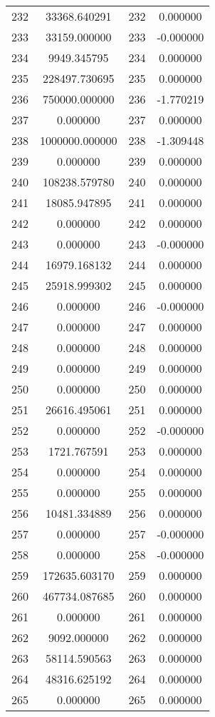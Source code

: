 \documentclass[12pt]{article}
\begin{document}
\begin{longtable}{@{}cccc@{}}
232 & 33368.640291 & 232 & 0.000000 \\
233 & 33159.000000 & 233 & -0.000000 \\
234 & 9949.345795 & 234 & 0.000000 \\
235 & 228497.730695 & 235 & 0.000000 \\
236 & 750000.000000 & 236 & -1.770219 \\
237 & 0.000000 & 237 & 0.000000 \\
238 & 1000000.000000 & 238 & -1.309448 \\
239 & 0.000000 & 239 & 0.000000 \\
240 & 108238.579780 & 240 & 0.000000 \\
241 & 18085.947895 & 241 & 0.000000 \\
242 & 0.000000 & 242 & 0.000000 \\
243 & 0.000000 & 243 & -0.000000 \\
244 & 16979.168132 & 244 & 0.000000 \\
245 & 25918.999302 & 245 & 0.000000 \\
246 & 0.000000 & 246 & -0.000000 \\
247 & 0.000000 & 247 & 0.000000 \\
248 & 0.000000 & 248 & 0.000000 \\
249 & 0.000000 & 249 & 0.000000 \\
250 & 0.000000 & 250 & 0.000000 \\
251 & 26616.495061 & 251 & 0.000000 \\
252 & 0.000000 & 252 & -0.000000 \\
253 & 1721.767591 & 253 & 0.000000 \\
254 & 0.000000 & 254 & 0.000000 \\
255 & 0.000000 & 255 & 0.000000 \\
256 & 10481.334889 & 256 & 0.000000 \\
257 & 0.000000 & 257 & -0.000000 \\
258 & 0.000000 & 258 & -0.000000 \\
259 & 172635.603170 & 259 & 0.000000 \\
260 & 467734.087685 & 260 & 0.000000 \\
261 & 0.000000 & 261 & 0.000000 \\
262 & 9092.000000 & 262 & 0.000000 \\
263 & 58114.590563 & 263 & 0.000000 \\
264 & 48316.625192 & 264 & 0.000000 \\
265 & 0.000000 & 265 & 0.000000 \\

\end{longtable}
\end{document}
